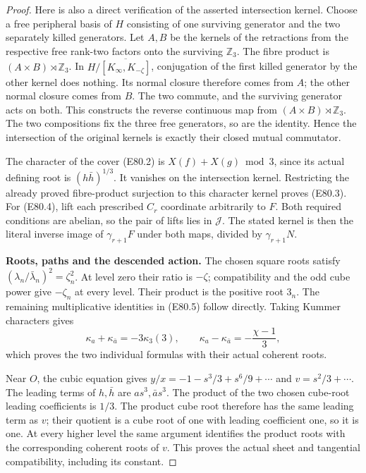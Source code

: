 \begin{proof}
Here is also a direct verification of the asserted
intersection kernel. Choose a free peripheral basis
of $H$ consisting of one surviving generator and
the two separately killed generators. Let $A,B$ be
the kernels of the retractions from the respective
free rank-two factors onto the surviving
$\mathbb Z_3$. The fibre product is
$(A\times B)\rtimes\mathbb Z_3$. In
$H/\overline{[K_\infty,K_{-\zeta}]}$, conjugation
of the first killed generator by the other kernel
does nothing. Its normal closure therefore comes
from $A$; the other normal closure comes from $B$.
The two commute, and the surviving generator acts
on both. This constructs the reverse continuous map
from $(A\times B)\rtimes\mathbb Z_3$. The two
compositions fix the three free generators, so are
the identity. Hence the intersection of the original
kernels is exactly their closed mutual commutator.

The character of the cover (E80.2) is
$X(f)+X(g)\bmod3$, since its actual defining root
is $(h\bar h)^{1/3}$. It vanishes on the intersection
kernel. Restricting the already proved fibre-product
surjection to this character kernel proves (E80.3).
For (E80.4), lift each prescribed $C_r$ coordinate
arbitrarily to $F$. Both required conditions are
abelian, so the pair of lifts lies in $\mathcal J$.
The stated kernel is then the literal inverse image
of $\gamma_{r+1}F$ under both maps, divided by
$\gamma_{r+1}N$.

\textbf{Roots, paths and the descended action.}
The chosen square roots satisfy
$(\lambda_n/\bar\lambda_n)^2=\zeta_n^2$.
At level zero their ratio is $-\zeta$; compatibility
and the odd cube power give $-\zeta_n$ at every
level. Their product is the positive root $3_n$.
The remaining multiplicative identities in (E80.5)
follow directly. Taking Kummer characters gives
\[
 \kappa_a+\kappa_{\bar a}=-3\kappa_3(3),\qquad
 \kappa_a-\kappa_{\bar a}=-\frac{\chi-1}{3},
 \tag{E80.18}
\]
which proves the two individual formulas with their
actual coherent roots.

Near $O$, the cubic equation gives
$y/x=-1-s^3/3+s^6/9+\cdots$ and
$v=s^2/3+\cdots$. The leading terms of $h,\bar h$
are $a s^3,\bar a s^3$. The product of the two
chosen cube-root leading coefficients is $1/3$.
The product cube root therefore has the same
leading term as $v$; their quotient is a cube root
of one with leading coefficient one, so it is one.
At every higher level the same argument identifies
the product roots with the corresponding coherent
roots of $v$. This proves the actual sheet and
tangential compatibility, including its constant.


\end{proof}
